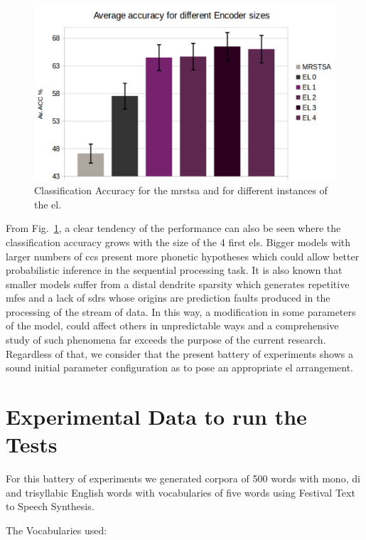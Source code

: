\documentclass{book}
\begin{document}
\begin{appendices}
\begin{figure}[h!]
    \centering
    \includegraphics[width=1.0\textwidth]{WordClassification3.png}
    \caption{Classification Accuracy for the \gls{mrstsa} and for different instances of the \gls{el}.}
    \label{fig:WordClassification3}
\end{figure}

From Fig.~\ref{fig:WordClassification3}, a clear tendency of the performance can also be seen where the classification accuracy grows with the size of the 4 first \glspl{el}. Bigger models with larger numbers of \glspl{cc} present more phonetic hypotheses which could allow better probabilistic inference in the sequential processing task. It is also known that smaller models suffer from a distal dendrite sparsity which generates repetitive \glspl{mfe} and a lack of \glspl{sdr} whose origins are prediction faults produced in the processing of the stream of data. In this way, a modification in some parameters of the model, could affect others in unpredictable ways and a comprehensive study of such phenomena far exceeds the purpose of the current research. Regardless of that, we consider that the present battery of experiments shows a sound initial parameter configuration as to pose an appropriate \gls{el} arrangement.

\section{Experimental Data to run the Tests}

For this battery of experiments we generated corpora of 500 words with mono, di and trisyllabic English words with vocabularies of five words using Festival Text to Speech Synthesis.

The Vocabularies used:


\end{appendices}
\end{document}
